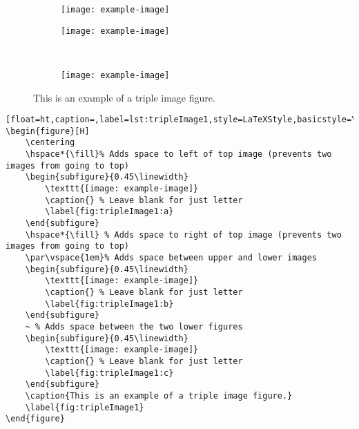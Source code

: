 		\vspace*{\fill}
		\begin{figure}[H]
			\centering
			\hspace*{\fill}%
			\begin{subfigure}{0.45\linewidth}
				\texttt{[image: example-image]}
				\caption{} %
				\label{fig:tripleImage1:a}
			\end{subfigure}
			\hspace*{\fill} %
			\par\vspace{1em}%
			\begin{subfigure}{0.45\linewidth}
				\texttt{[image: example-image]}
				\caption{} %
				\label{fig:tripleImage1:b}
			\end{subfigure}
			~ %
			\begin{subfigure}{0.45\linewidth}
				\texttt{[image: example-image]}
				\caption{} %
				\label{fig:tripleImage1:c}
			\end{subfigure}
			\caption{This is an example of a triple image figure.}
			\label{fig:tripleImage1}
		\end{figure}
		\begin{lstlisting}[float=ht,caption=,label=lst:tripleImage1,style=LaTeXStyle,basicstyle=\tiny\ttfamily,]
\begin{figure}[H]
	\centering
	\hspace*{\fill}% Adds space to left of top image (prevents two images from going to top)
	\begin{subfigure}{0.45\linewidth}
		\texttt{[image: example-image]}
		\caption{} % Leave blank for just letter
		\label{fig:tripleImage1:a}
	\end{subfigure}
	\hspace*{\fill} % Adds space to right of top image (prevents two images from going to top)
	\par\vspace{1em}% Adds space between upper and lower images
	\begin{subfigure}{0.45\linewidth}
		\texttt{[image: example-image]}
		\caption{} % Leave blank for just letter
		\label{fig:tripleImage1:b}
	\end{subfigure}
	~ % Adds space between the two lower figures
	\begin{subfigure}{0.45\linewidth}
		\texttt{[image: example-image]}
		\caption{} % Leave blank for just letter
		\label{fig:tripleImage1:c}
	\end{subfigure}
	\caption{This is an example of a triple image figure.}
	\label{fig:tripleImage1}
\end{figure}
		\end{lstlisting}
		\vspace*{\fill}
		\pagebreak



